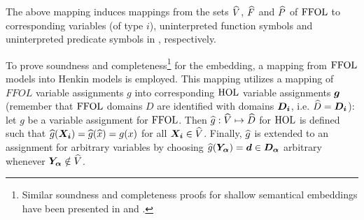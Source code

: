 The above mapping induces mappings from the sets $\widehat{V}$, $\widehat{F}$ and $\widehat{P}$
of $\text{\textrm{FFOL}}$ to corresponding variables (of type $i$), uninterpreted function
symbols and uninterpreted predicate symbols in \HOL, respectively.

To prove soundness and completeness\footnote{Similar soundness and completeness proofs for
  shallow semantical embeddings have been presented in \cite{C37} and
  \cite{J31}.} for the embedding, a
mapping from $\text{\textrm{FFOL}}$ models into Henkin models is
employed.
This mapping utilizes a mapping of $FFOL$ variable
assignments $g$ into corresponding $\text{\textrm{HOL}}$ variable assignments
$\boldsymbol{g}$ (remember that $\text{\textrm{FFOL}}$  domains $D$ are  identified with 
\HOL domains $\boldsymbol{D_i}$, i.e. $\widehat{D} = \boldsymbol{D_i}$): let $g$ be a variable assignment for
  $\text{\textrm{FFOL}}$.  Then $\widehat{g}:
  \widehat{V}\mapsto \widehat{D}$ for $\text{\textrm{HOL}}$ is defined such that
  $\widehat{g}(\boldsymbol{X_i}) = \widehat{g}(\widehat{x}) = g(x)$ 
for all $\boldsymbol{X_i}\in \widehat{V}$. 
Finally, $\widehat{g}$ is extended to an assignment for arbitrary
variables by choosing
$\widehat{g}(\boldsymbol{Y_\alpha}) = \boldsymbol{d}\in \boldsymbol{D_\alpha}$ arbitrary 
whenever $\boldsymbol{Y_\alpha} \notin \widehat{V}$.

